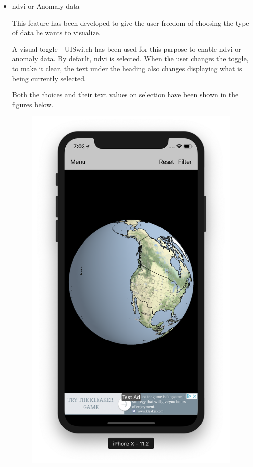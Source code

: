 \begin{itemize}
    \item \gls{ndvi} or Anomaly data
    
    This feature has been developed to give the user freedom of choosing the type of data he wants to visualize.
    
    A visual toggle - UISwitch has been used for this purpose to enable \gls{ndvi} or anomaly data. By default, \gls{ndvi} is selected. When the user changes the toggle, to make it clear, the text under the heading also changes displaying what is being currently selected.
    
    Both the choices and their text values on selection have been shown in the figures below.
    
    \begin{figure}[!htb]
        \begin{minipage}{0.5\textwidth}
            \centering
            \includegraphics[width=0.8\linewidth]{figures/ch4/home_globe.png}

\end{minipage}
\end{figure}
\end{itemize}
